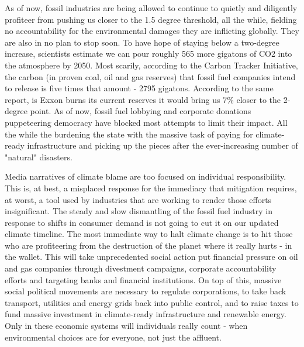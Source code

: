    As of now, fossil industries are being allowed to continue to quietly
   and diligently profiteer from pushing us closer to the 1.5 degree
   threshold, all the while, fielding no accountability for the
   environmental damages they are inflicting globally. They are also in no
   plan to stop soon. To have hope of staying below a two-degree increase,
   scientists estimate we can pour roughly 565 more gigatons of CO2 into
   the atmosphere by 2050. Most scarily, according to the Carbon Tracker
   Initiative, the carbon (in proven coal, oil and gas reserves) that
   fossil fuel companies intend to release is five times that amount -
   2795 gigatons. According to the same report, is Exxon burns its current
   reserves it would bring us 7\% closer to the 2-degree point. As of now,
   fossil fuel lobbying and corporate donations puppeteering democracy
   have blocked most attempts to limit their impact. All the while the
   burdening the state with the massive task of paying for climate-ready
   infrastructure and picking up the pieces after the ever-increasing
   number of "natural" disasters.

   Media narratives of climate blame are too focused on individual
   responsibility. This is, at best, a misplaced response for the
   immediacy that mitigation requires, at worst, a tool used by industries
   that are working to render those efforts insignificant. The steady and
   slow dismantling of the fossil fuel industry in response to shifts in
   consumer demand is not going to cut it on our updated climate timeline.
   The most immediate way to halt climate change is to hit those who are
   profiteering from the destruction of the planet where it really hurts -
   in the wallet. This will take unprecedented social action put financial
   pressure on oil and gas companies through divestment campaigns,
   corporate accountability efforts and targeting banks and financial
   institutions. On top of this, massive social political movements are
   necessary to regulate corporations, to take back transport, utilities
   and energy grids back into public control, and to raise taxes to fund
   massive investment in climate-ready infrastructure and renewable
   energy. Only in these economic systems will individuals really count -
   when environmental choices are for everyone, not just the affluent.
